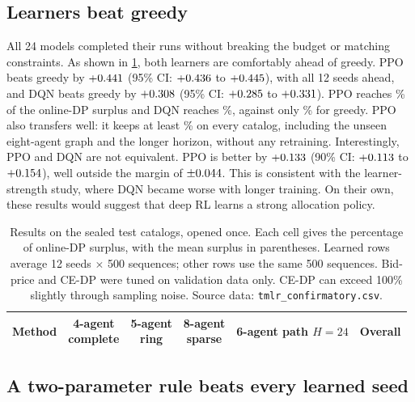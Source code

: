 \documentclass[10pt]{article}
\begin{document}
\subsection{Learners beat greedy}\label{sec:locked}

All 24 models completed their runs without breaking the budget or matching constraints. As shown in \cref{tab:main}, both learners are comfortably ahead of greedy. PPO beats greedy by $+0.441$ (95\% CI: $+0.436$ to $+0.445$), with all 12 seeds ahead, and DQN beats greedy by $+0.308$ (95\% CI: $+0.285$ to $+0.331$). PPO reaches \cfFracPpo\% of the online-DP surplus and DQN reaches \cfFracDqn\%, against only \cfFracGreedy\% for greedy. PPO also transfers well: it keeps at least \cfFracMinPpo\% on every catalog, including the unseen eight-agent graph and the longer horizon, without any retraining. Interestingly, PPO and DQN are not equivalent. PPO is better by $+0.133$ (90\% CI: $+0.113$ to $+0.154$), well outside the margin of $\pm0.044$. This is consistent with the learner-strength study, where DQN became worse with longer training. On their own, these results would suggest that deep RL learns a strong allocation policy.

\begin{table}[t]
\centering
\caption{Results on the sealed test catalogs, opened once. Each cell gives the percentage of online-DP surplus, with the mean surplus in parentheses. Learned rows average 12 seeds $\times$ 500 sequences; other rows use the same 500 sequences. Bid-price and CE-DP were tuned on validation data only. CE-DP can exceed 100\% slightly through sampling noise. Source data: \texttt{tmlr\_confirmatory.csv}.}
\label{tab:main}
\small
\setlength{\tabcolsep}{4pt}
\begin{tabular}{@{}lccccc@{}}
\toprule
Method & \shortstack{4-agent\\complete} & \shortstack{5-agent\\ring} & \shortstack{8-agent\\sparse} & \shortstack{6-agent path\\$H{=}24$} & Overall \\
\midrule

\end{tabular}
\end{table}

\subsection{A two-parameter rule beats every learned seed}\label{sec:strong}
\end{document}
